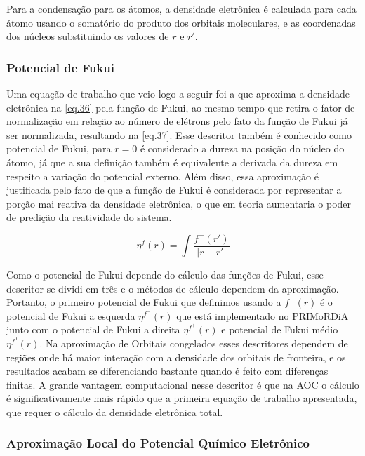 \documentclass[a4paper,11pt]{refart}
\begin{document}
Para a condensação para os átomos, a densidade eletrônica é calculada para cada átomo usando o somatório do produto dos orbitais moleculares, e as coordenadas dos núcleos substituindo os valores de $r$ e $r'$. 

\subsubsection{Potencial de Fukui}


Uma equação de trabalho que veio logo a seguir foi a que aproxima a densidade eletrônica na \autoref{eq.36} pela função de Fukui, ao mesmo tempo que retira o fator de normalização em relação ao número de elétrons pelo fato da função de Fukui já ser normalizada, resultando na \autoref{eq.37}. Esse descritor também é conhecido como potencial de Fukui, para $r = 0$ é considerado a dureza na posição do núcleo do átomo, já que a sua definição também é equivalente a derivada da dureza em respeito a variação do potencial externo. Além disso, essa aproximação é justificada pelo fato de que a função de Fukui é considerada por representar a porção mai reativa da densidade eletrônica, o que em teoria aumentaria o poder de predição da reatividade do sistema.   

\begin{equation}
\eta^f(r) = \int \frac{f^{-}(r')}{|r - r'|}
\label{eq.37}
\end{equation}

Como o potencial de Fukui depende do cálculo das funções de Fukui, esse descritor se dividi em três e o métodos de cálculo dependem da aproximação. Portanto, o primeiro potencial de Fukui que definimos usando a $f^-(r)$ é o potencial de Fukui a esquerda $\eta^{f^-}(r)$ que está implementado no PRIMoRDiA junto com o potencial de Fukui a direita $\eta^{f^+}(r)$ e potencial de Fukui médio $\eta^{f^0}(r)$. Na aproximação de Orbitais congelados esses descritores dependem de regiões onde há maior interação com a densidade dos orbitais de fronteira, e os resultados acabam se diferenciando bastante quando é feito com diferenças finitas. A grande vantagem computacional nesse descritor é que na AOC o cálculo é significativamente mais rápido que a primeira equação de trabalho apresentada, que requer o cálculo da densidade eletrônica total. 

\subsubsection{Aproximação Local do Potencial Químico Eletrônico}
\end{document}
